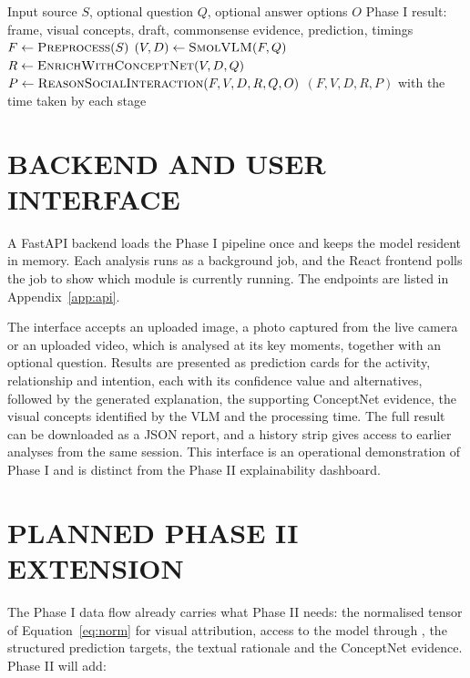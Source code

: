 \begin{algorithm}[H]
\caption{Phase I Pipeline}
\label{alg:pipeline}
\begin{algorithmic}[1]
\Require Input source $S$, optional question $Q$, optional answer options $O$
\Ensure Phase I result: frame, visual concepts, draft, commonsense evidence, prediction, timings
\State $F \gets \textsc{Preprocess}(S)$ 
\State $(V, D) \gets \textsc{SmolVLM}(F, Q)$ 
\State $R \gets \textsc{EnrichWithConceptNet}(V, D, Q)$ 
\State $P \gets \textsc{ReasonSocialInteraction}(F, V, D, R, Q, O)$ 
\State \Return $(F, V, D, R, P)$ with the time taken by each stage
\end{algorithmic}
\end{algorithm}

\section{BACKEND AND USER INTERFACE}

A FastAPI backend loads the Phase I pipeline once and keeps the model resident in memory. Each analysis runs as a background job, and the React frontend polls the job to show which module is currently running. The endpoints are listed in Appendix~\ref{app:api}.

The interface accepts an uploaded image, a photo captured from the live camera or an uploaded video, which is analysed at its key moments, together with an optional question. Results are presented as prediction cards for the activity, relationship and intention, each with its confidence value and alternatives, followed by the generated explanation, the supporting ConceptNet evidence, the visual concepts identified by the VLM and the processing time. The full result can be downloaded as a JSON report, and a history strip gives access to earlier analyses from the same session. This interface is an operational demonstration of Phase I and is distinct from the Phase II explainability dashboard.

\section{PLANNED PHASE II EXTENSION}
\label{sec:phase2plan}

The Phase I data flow already carries what Phase II needs: the normalised tensor of Equation~\ref{eq:norm} for visual attribution, access to the model through , the structured prediction targets, the textual rationale and the ConceptNet evidence. Phase II will add:

